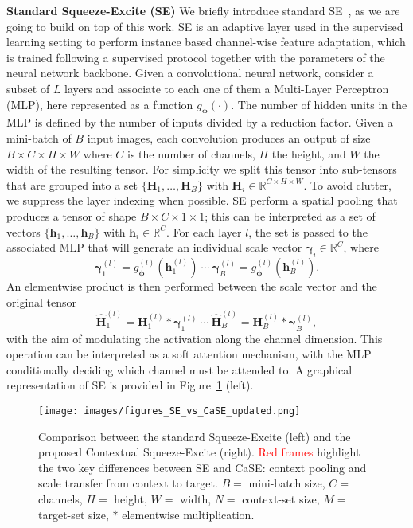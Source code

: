 \documentclass{article}
\begin{document}
\textbf{Standard Squeeze-Excite (SE)} We briefly introduce standard SE~\citep{hu2018squeeze}, as we are going to build on top of this work. SE is an adaptive layer used in the supervised learning setting to perform instance based channel-wise feature adaptation, which is trained following a supervised protocol together with the parameters of the neural network backbone.
Given a convolutional neural network, consider a subset of $L$ layers and associate to each one of them a Multi-Layer Perceptron (MLP), here represented as a function $g_{\boldsymbol{\phi}}(\cdot)$. The number of hidden units in the MLP is defined by the number of inputs divided by a reduction factor.
Given a mini-batch of $B$ input images, each convolution produces an output of size $B \times C \times H \times W$ where $C$ is the number of channels, $H$ the height, and $W$ the width of the resulting tensor. For simplicity we split this tensor into sub-tensors that are grouped into a set $\{ \mathbf{H}_1, \dots, \mathbf{H}_B \}$ with $ \mathbf{H}_i \in \mathbb{R}^{C \times H \times W}$. To avoid clutter, we suppress the layer indexing when possible.
SE perform a spatial pooling that produces a tensor of shape $B \times C \times 1 \times 1$; this can be interpreted as a set of vectors $\{ \mathbf{h}_1, \dots, \mathbf{h}_B \}$ with $\mathbf{h}_i \in \mathbb{R}^{C}$. For each layer $l$, the set is passed to the associated MLP that will generate an individual scale vector $\boldsymbol{\gamma}_i \in \mathbb{R}^{C}$, where
\begin{equation}
    \boldsymbol{\gamma}^{(l)}_1 = g^{(l)}_{\boldsymbol{\phi}} \left( \mathbf{h}^{(l)}_1 \right) \ \cdots \ \boldsymbol{\gamma}^{(l)}_B = g^{(l)}_{\boldsymbol{\phi}} \left( \mathbf{h}^{(l)}_B \right).
\end{equation}
An elementwise product is then performed between the scale vector and the original tensor 
\begin{equation}
    \hat{\mathbf{H}}^{(l)}_1 = \mathbf{H}_{1}^{(l)} \ast \boldsymbol{\gamma}^{(l)}_1 \ \cdots \ \hat{\mathbf{H}}^{(l)}_B = \mathbf{H}_{B}^{(l)} \ast \boldsymbol{\gamma}^{(l)}_B,
\end{equation}
with the aim of modulating the activation along the channel dimension. This operation can be interpreted as a soft attention mechanism, with the MLP conditionally deciding which channel must be attended to. A graphical representation of SE is provided in Figure~\ref{fig:comparison_se_case} (left).

\begin{figure}[t]
  \centering
  \texttt{[image: images/figures\_SE\_vs\_CaSE\_updated.png]}
  \caption{Comparison between the standard Squeeze-Excite (left) and the proposed Contextual Squeeze-Excite (right). \textcolor{red}{Red frames} highlight the two key differences between SE and CaSE: context pooling and scale transfer from context to target.
  $B=$ mini-batch size, $C=$ channels, $H=$ height, $W=$ width, $N=$ context-set size, $M=$ target-set size, $\ast$ elementwise multiplication.}
  \label{fig:comparison_se_case}
\end{figure}
\end{document}
